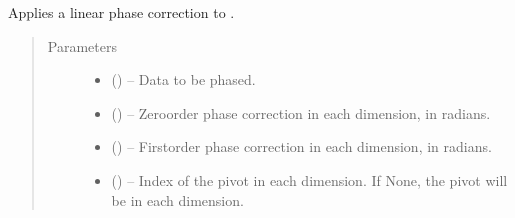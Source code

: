 \documentclass[letterpaper,10pt,english]{sphinxmanual}
\begin{document}

\begin{fulllineitems}
\label{\detokenize{references/sig:nmrespy.sig.phase}}
\sphinxAtStartPar
Applies a linear phase correction to .
\begin{quote}\begin{description}
\item[{Parameters}] \leavevmode\begin{itemize}
\item {} 
\sphinxAtStartPar
{} () – Data to be phased.

\item {} 
\sphinxAtStartPar
{} (\sphinxstyleliteralemphasis{\sphinxupquote{{[}}}\sphinxstyleliteralemphasis{\sphinxupquote{{]} or }}\sphinxstyleliteralemphasis{\sphinxupquote{{[}}}\sphinxstyleliteralemphasis{\sphinxupquote{, }}\sphinxstyleliteralemphasis{\sphinxupquote{{]}}}) – Zero\sphinxhyphen{}order phase correction in each dimension, in radians.

\item {} 
\sphinxAtStartPar
{} (\sphinxstyleliteralemphasis{\sphinxupquote{{[}}}\sphinxstyleliteralemphasis{\sphinxupquote{{]} or }}\sphinxstyleliteralemphasis{\sphinxupquote{{[}}}\sphinxstyleliteralemphasis{\sphinxupquote{, }}\sphinxstyleliteralemphasis{\sphinxupquote{{]}}}) – First\sphinxhyphen{}order phase correction in each dimension, in radians.

\item {} 
\sphinxAtStartPar
{} (\sphinxstyleliteralemphasis{\sphinxupquote{{[}}}\sphinxstyleliteralemphasis{\sphinxupquote{{]}}}\sphinxstyleliteralemphasis{\sphinxupquote{, }}\sphinxstyleliteralemphasis{\sphinxupquote{{[}}}\sphinxstyleliteralemphasis{\sphinxupquote{, }}\sphinxstyleliteralemphasis{\sphinxupquote{{]} or }}) – Index of the pivot in each dimension. If None, the pivot will be 
in each dimension.


\end{itemize}
\end{description}
\end{quote}
\end{fulllineitems}
\end{document}

